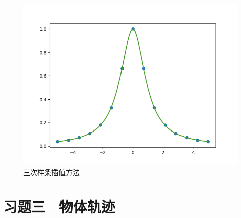\begin{figure}[htbp]
{\begin{minipage}[b]{.4\linewidth}
            \includegraphics[scale=0.29]{pic/三次样条/14.png}
        \end{minipage}
    }
    \caption{三次样条插值方法}
\end{figure}

\section{习题三 \ 物体轨迹}

